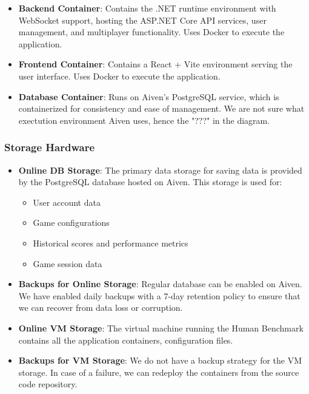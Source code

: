 \begin{itemize}
    \item \textbf{Backend Container}: Contains the .NET runtime environment with
          WebSocket support, hosting the ASP.NET Core API services, user management, and multiplayer functionality. Uses Docker to execute the application.
    \item \textbf{Frontend Container}: Contains a React + Vite environment serving
          the user interface. Uses Docker to execute the application.
    \item \textbf{Database Container}: Runs on Aiven's PostgreSQL service, which is
          containerized for consistency and ease of management. We are not sure what exectution environment Aiven uses, hence the "???" in the diagram.
\end{itemize}


\subsubsection{Storage Hardware}

\begin{itemize}
    \item \textbf{Online DB Storage}: The primary data storage for saving data is
          provided by the PostgreSQL database hosted on Aiven. This storage is used
          for:
          \begin{itemize}
              \item User account data
              \item Game configurations
              \item Historical scores and performance metrics
              \item Game session data
          \end{itemize}
    \item \textbf{Backups for Online Storage}: Regular database can be enabled on Aiven. We
          have enabled daily backups with a 7-day retention policy to ensure that we
          can recover from data loss or corruption.
    \item \textbf{Online VM Storage}: The virtual machine running the Human Benchmark contains all the application containers, configuration files.
    \item \textbf{Backups for VM Storage}: We do not have a backup strategy for the VM storage. In case of a failure, we can redeploy the containers from the source code repository.
\end{itemize}

